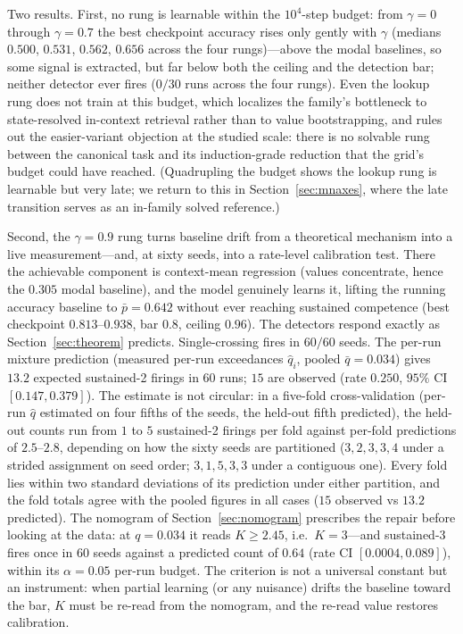 \documentclass[11pt]{article}
\theoremstyle{plain}
\theoremstyle{definition}
\begin{document}
Two results. First, no rung is learnable within the $10^4$-step budget: from $\gamma=0$
through $\gamma=0.7$ the best checkpoint accuracy rises only gently with $\gamma$ (medians
$0.500$, $0.531$, $0.562$, $0.656$ across the four rungs)---above the modal baselines, so
some signal is extracted, but far below both the ceiling and the detection bar; neither
detector ever fires ($0/30$ runs across the four rungs). Even the lookup rung does not
train at this budget, which localizes the family's bottleneck to state-resolved
in-context retrieval rather than to value bootstrapping, and rules out the
easier-variant objection at the studied scale: there is no solvable rung between the
canonical task and its induction-grade reduction that the grid's budget could have
reached. (Quadrupling the budget shows the lookup rung is learnable but very late; we
return to this in Section~\ref{sec:mnaxes}, where the late transition serves as an
in-family solved reference.)

Second, the $\gamma=0.9$ rung turns baseline drift from a theoretical mechanism into a
live measurement---and, at sixty seeds, into a rate-level calibration test. There the
achievable component is context-mean regression (values concentrate, hence the $0.305$
modal baseline), and the model genuinely learns it, lifting the running accuracy
baseline to $\bar p = 0.642$ without ever reaching sustained competence (best checkpoint
$0.813$--$0.938$, bar $0.8$, ceiling $0.96$). The detectors respond exactly as
Section~\ref{sec:theorem} predicts. Single-crossing fires in $60/60$ seeds. The per-run
mixture prediction (measured per-run exceedances $\hat q_i$, pooled $\bar q=0.034$)
gives $13.2$ expected sustained-2 firings in 60 runs; $15$ are observed (rate $0.250$,
$95\%$ CI $[0.147,0.379]$). The estimate is not circular: in a five-fold cross-validation
(per-run $\hat q$ estimated on four fifths of the seeds, the held-out fifth predicted),
the held-out counts run from $1$ to $5$ sustained-2 firings per fold against per-fold
predictions of $2.5$--$2.8$, depending on how the sixty seeds are partitioned
($3,2,3,3,4$ under a strided assignment on seed order; $3,1,5,3,3$ under a contiguous
one). Every fold lies within two standard deviations of its prediction under either
partition, and the fold totals agree with the pooled figures in all cases ($15$ observed
vs $13.2$ predicted). The nomogram of Section~\ref{sec:nomogram} prescribes
the repair before looking at the data: at $q=0.034$ it reads $K\geq2.45$, i.e.\
$K=3$---and sustained-3 fires once in $60$ seeds against a predicted count of $0.64$
(rate CI $[0.0004,0.089]$), within its $\alpha=0.05$ per-run budget. The criterion is not a universal constant but an instrument: when
partial learning (or any nuisance) drifts the baseline toward the bar, $K$ must be
re-read from the nomogram, and the re-read value restores calibration.
\end{document}
